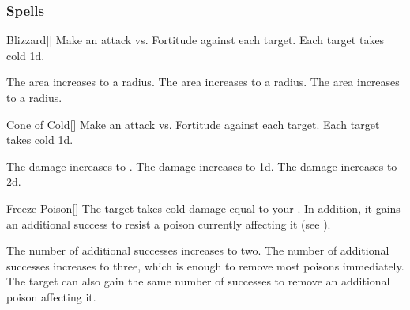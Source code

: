 \subsubsection{Spells}


\lowercase{\hypertarget{spell:Blizzard}{}}\label{spell:Blizzard}
\begin{freeability}[Rank 1]{\hypertarget{spell:Blizzard}{Blizzard}}[]
Make an attack vs. Fortitude against each target.
\hit Each target takes cold  \minus1d.

\rankline
{} The area increases to a \areamed radius.
 The area increases to a \arealarge radius.
 The area increases to a \areahuge radius.
\end{freeability}
\vspace{0.25em}



\lowercase{\hypertarget{spell:Cone of Cold}{}}\label{spell:Cone of Cold}
\begin{freeability}[Rank 1]{\hypertarget{spell:Cone of Cold}{Cone of Cold}}[]
Make an attack vs. Fortitude against each target.
\hit Each target takes cold  \minus1d.

\rankline
{} The damage increases to .
 The damage increases to  \plus1d.
 The damage increases to  \plus2d.
\end{freeability}
\vspace{0.25em}



\lowercase{\hypertarget{spell:Freeze Poison}{}}\label{spell:Freeze Poison}
\begin{freeability}[Rank 1]{\hypertarget{spell:Freeze Poison}{Freeze Poison}}[]
The target takes cold damage equal to your .
In addition, it gains an additional success to resist a poison currently affecting it (see ).

\rankline
{} The number of additional successes increases to two.
 The number of additional successes increases to three, which is enough to remove most poisons immediately.
 The target can also gain the same number of successes to remove an additional poison affecting it.
\end{freeability}
\vspace{0.25em}




